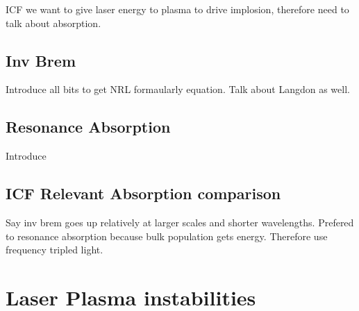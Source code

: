 ICF we want to give laser energy to plasma to drive implosion, therefore need to talk about absorption.

\subsection{Inv Brem}%
\label{sec:theory_in_brem}

Introduce all bits to get NRL formaularly equation.
Talk about Langdon as well.

\subsection{Resonance Absorption}%
\label{sec:theory_res_abs}

Introduce

\subsection{ICF Relevant Absorption comparison}%
\label{sec:theory_absorption_comparison}

Say inv brem goes up relatively at larger scales and shorter wavelengths.
Prefered to resonance absorption because bulk population gets energy.
Therefore use frequency tripled light.


\section{Laser Plasma instabilities}%
\label{sec:theory_LPIs}

